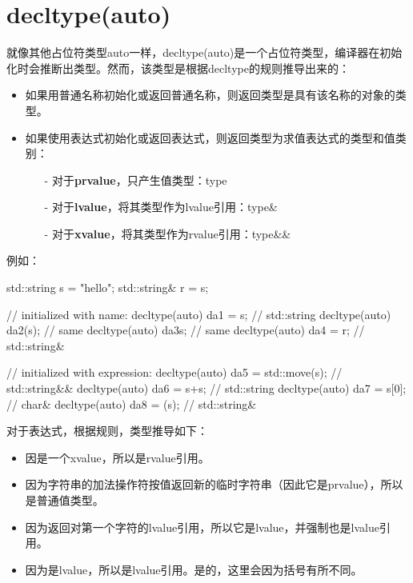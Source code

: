 \section{decltype(auto)}
就像其他占位符类型auto一样，decltype(auto)是一个占位符类型，编译器在初始化时会推断出类型。然而，该类型是根据decltype的规则推导出来的：

\begin{itemize}
	\item 如果用普通名称初始化或返回普通名称，则返回类型是具有该名称的对象的类型。
	\item 如果使用表达式初始化或返回表达式，则返回类型为求值表达式的类型和值类别：
	\begin{itemize}
		\item[-] 对于\textbf{prvalue}，只产生值类型：type
		\item[-] 对于\textbf{lvalue}，将其类型作为lvalue引用：type\&
		\item[-] 对于\textbf{xvalue}，将其类型作为rvalue引用：type\&\&
	\end{itemize}
\end{itemize}

例如：

\begin{cppcode}
std::string s = "hello";
std::string& r = s;

// initialized with name:
decltype(auto) da1 = s; // std::string
decltype(auto) da2(s); // same
decltype(auto) da3{s}; // same
decltype(auto) da4 = r; // std::string&

// initialized with expression:
decltype(auto) da5 = std::move(s); // std::string&&
decltype(auto) da6 = s+s; // std::string
decltype(auto) da7 = s[0]; // char&
decltype(auto) da8 = (s); // std::string&
\end{cppcode}

对于表达式，根据规则，类型推导如下：

\begin{itemize}
	\item 因是一个xvalue，所以是rvalue引用。
	\item 因为字符串的加法操作符按值返回新的临时字符串（因此它是prvalue），所以是普通值类型。
	\item 因为返回对第一个字符的lvalue引用，所以它是lvalue，并强制也是lvalue引用。
	\item 因为是lvalue，所以是lvalue引用。是的，这里会因为括号有所不同。
\end{itemize}

